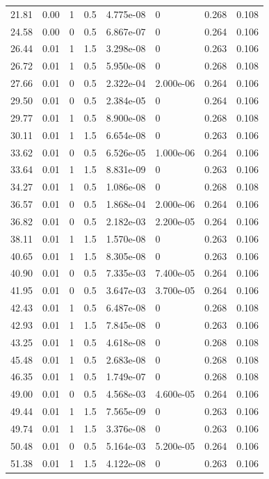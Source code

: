 \documentclass[preview]{standalone}
\begin{document}
{{\begin{tabular}{L{1.2cm}C{1.2cm} C{0.3cm}C{0.5cm} C{1.4cm}C{1.4cm} C{1.4cm}C{1.4cm}}
  21.81  &  0.00  & 1     & 0.5 &  4.775e-08  & 0  & 0.268 &  0.108   \\ 
  24.58  &  0.00  & 0     & 0.5 &  6.867e-07  & 0  & 0.264 &  0.106   \\ 
  26.44  &  0.01  & 1     & 1.5 &  3.298e-08  & 0  & 0.263 &  0.106   \\ 
  26.72  &  0.01  & 1     & 0.5 &  5.950e-08  & 0  & 0.268 &  0.108   \\ 
  27.66  &  0.01  & 0     & 0.5 &  2.322e-04  & 2.000e-06  & 0.264 &  0.106   \\ 
  29.50  &  0.01  & 0     & 0.5 &  2.384e-05  & 0  & 0.264 &  0.106   \\ 
  29.77  &  0.01  & 1     & 0.5 &  8.900e-08  & 0  & 0.268 &  0.108   \\ 
  30.11  &  0.01  & 1     & 1.5 &  6.654e-08  & 0  & 0.263 &  0.106   \\ 
  33.62  &  0.01  & 0     & 0.5 &  6.526e-05  & 1.000e-06  & 0.264 &  0.106   \\ 
  33.64  &  0.01  & 1     & 1.5 &  8.831e-09  & 0  & 0.263 &  0.106   \\ 
  34.27  &  0.01  & 1     & 0.5 &  1.086e-08  & 0  & 0.268 &  0.108   \\ 
  36.57  &  0.01  & 0     & 0.5 &  1.868e-04  & 2.000e-06  & 0.264 &  0.106   \\ 
  36.82  &  0.01  & 0     & 0.5 &  2.182e-03  & 2.200e-05  & 0.264 &  0.106   \\ 
  38.11  &  0.01  & 1     & 1.5 &  1.570e-08  & 0  & 0.263 &  0.106   \\ 
  40.65  &  0.01  & 1     & 1.5 &  8.305e-08  & 0  & 0.263 &  0.106   \\ 
  40.90  &  0.01  & 0     & 0.5 &  7.335e-03  & 7.400e-05  & 0.264 &  0.106   \\ 
  41.95  &  0.01  & 0     & 0.5 &  3.647e-03  & 3.700e-05  & 0.264 &  0.106   \\ 
  42.43  &  0.01  & 1     & 0.5 &  6.487e-08  & 0  & 0.268 &  0.108   \\ 
  42.93  &  0.01  & 1     & 1.5 &  7.845e-08  & 0  & 0.263 &  0.106   \\ 
  43.25  &  0.01  & 1     & 0.5 &  4.618e-08  & 0  & 0.268 &  0.108   \\ 
  45.48  &  0.01  & 1     & 0.5 &  2.683e-08  & 0  & 0.268 &  0.108   \\ 
  46.35  &  0.01  & 1     & 0.5 &  1.749e-07  & 0  & 0.268 &  0.108   \\ 
  49.00  &  0.01  & 0     & 0.5 &  4.568e-03  & 4.600e-05  & 0.264 &  0.106   \\ 
  49.44  &  0.01  & 1     & 1.5 &  7.565e-09  & 0  & 0.263 &  0.106   \\ 
  49.74  &  0.01  & 1     & 1.5 &  3.376e-08  & 0  & 0.263 &  0.106   \\ 
  50.48  &  0.01  & 0     & 0.5 &  5.164e-03  & 5.200e-05  & 0.264 &  0.106   \\ 
  51.38  &  0.01  & 1     & 1.5 &  4.122e-08  & 0  & 0.263 &  0.106   \\ 
\hline 
\end{tabular} 

}}
\end{document}
